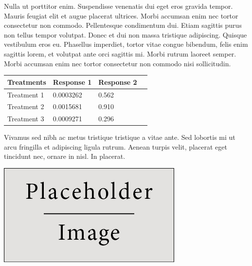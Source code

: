 \documentclass[a0,landscape]{a0poster}
\begin{document}
\begin{multicols}{4}
Nulla ut porttitor enim. Suspendisse venenatis dui eget eros gravida tempor. Mauris feugiat elit et augue placerat ultrices. Morbi accumsan enim nec tortor consectetur non commodo. Pellentesque condimentum dui. Etiam sagittis purus non tellus tempor volutpat. Donec et dui non massa tristique adipiscing. Quisque vestibulum eros eu. Phasellus imperdiet, tortor vitae congue bibendum, felis enim sagittis lorem, et volutpat ante orci sagittis mi. Morbi rutrum laoreet semper. Morbi accumsan enim nec tortor consectetur non commodo nisi sollicitudin.


\begin{center}\vspace{1cm}
\begin{tabular}{l l l l}
\toprule
\textbf{Treatments} & \textbf{Response 1} & \textbf{Response 2} \\
\midrule
Treatment 1 & 0.0003262 & 0.562 \\
Treatment 2 & 0.0015681 & 0.910 \\
Treatment 3 & 0.0009271 & 0.296 \\
\bottomrule
\end{tabular}
\end{center}\vspace{1cm}

Vivamus sed nibh ac metus tristique tristique a vitae ante. Sed lobortis mi ut arcu fringilla et adipiscing ligula rutrum. Aenean turpis velit, placerat eget tincidunt nec, ornare in nisl. In placerat.

\begin{center}\vspace{1cm}
\includegraphics[width=0.8\linewidth]{placeholder}
\end{center}\vspace{1cm}



\end{multicols}
\end{document}
